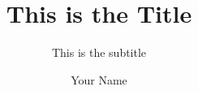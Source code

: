 

\title{This is the Title}

\subtitle{This is the subtitle}


\repdate{\today}


%
\author[IVC]{Your Name}

%
\newcommand{\TUGn}{Graz University of Technology}
\address[IVC]{Institute of Visual Computing \\ \TUGn, Austria}


%

